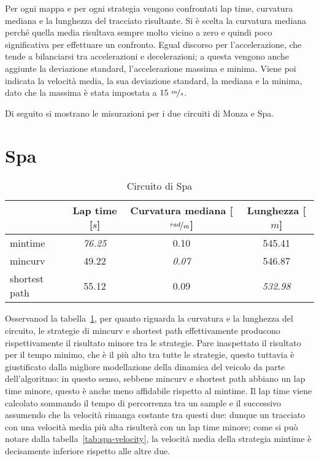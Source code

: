 Per ogni mappa e per ogni strategia vengono confrontati lap time, curvatura mediana e la lunghezza del
tracciato risultante. Si è scelta la curvatura mediana perché quella media risultava sempre molto
vicino a zero e quindi poco significativa per effettuare un confronto. Egual discorso per
l'accelerazione, che tende a bilanciarsi tra accelerazioni e decelerazioni; a questa vengono anche
aggiunte la deviazione standard, l'accelerazione massima e minima. Viene poi indicata la velocità media,
la sua deviazione standard, la mediana e la minima, dato che la massima è stata impostata a $15\
\nicefrac{m}{s}$.

Di seguito si mostrano le misurazioni per i due circuiti di Monza e Spa.

\section{Spa}
\label{sec:spa}
\begin{table}[H]
	\caption{Circuito di Spa}
	\label{tab:opt-spa}
	\begin{center}
		\begin{tabular} {l|c|c|c}
			                & Lap time [$s$]  & Curvatura mediana [$\nicefrac{rad}{m}$] & Lunghezza [$m$]\\
			\hline
			mintime         & \textit{76.25} & 0.10           & 545.41          \\
			mincurv         & 49.22          & \textit{0.07 } & 546.87          \\
			shortest path   & 55.12          & 0.09           & \textit{532.98} \\
			\hline
		\end{tabular}
	\end{center}
\end{table}
Osservanod la tabella~\ref{tab:opt-spa}, per quanto riguarda la curvatura e la lunghezza del circuito, le
strategie di mincurv e shortest path effettivamente producono rispettivamente il risultato minore tra le
strategie. Pare inaspettato il risultato per il tempo minimo, che è il più alto tra tutte le strategie,
questo tuttavia è giustificato dalla migliore modellazione della dinamica del veicolo da parte
dell'algoritmo: in questo senso, sebbene mincurv e shortest path abbiano un lap time minore, questo è
anche meno affidabile rispetto al mintime. Il lap time viene calcolato sommando il tempo di percorrenza
tra un sample e il successivo assumendo che la velocità rimanga costante tra questi due: dunque un
tracciato con una velocità media più alta risulterà con un lap time minore; come si può notare dalla
tabella~\ref{tab:spa-velocity}, la velocità media della strategia mintime è decisamente inferiore
rispetto alle altre due.

